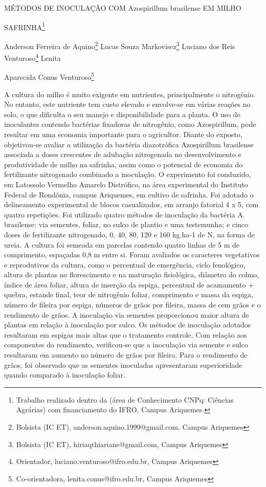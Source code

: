 \documentclass[article,12pt,onesidea,4paper,english,brazil]{abntex2}
\begin{document}
	
	
	\frenchspacing 
	
	\begin{center}
		\LARGE MÉTODOS DE INOCULAÇÃO COM Azospirillum brasilense EM MILHO
		
		SAFRINHA\footnote{Trabalho realizado dentro da (área de Conhecimento CNPq: Ciências Agrárias) com financiamento
			do IFRO, Campus Ariquemes.}
		
		\normalsize
		Anderson Ferreira de Aquino\footnote{Bolsista (IC ET), anderson.aquino.1999@gmail.com, Campus Ariquemes} 
		Lucas Souza Markoviscz\footnote{Bolsista (IC ET), hiriaqthiariane@gmail.com, Campus Ariquemes} 
		Luciano dos Reis Venturoso\footnote{Orientador, luciano.venturoso@ifro.edu.br, Campus Ariquemes} 
		Lenita
		
		Aparecida Conus Venturoso\footnote{Co-orientadora, lenita.conus@ifro.edu.br, Campus Ariquemes} 
	\end{center}
	
	\noindent A cultura do milho é muito exigente em nutrientes, principalmente o nitrogênio. No
	entanto, este nutriente tem custo elevado e envolve-se em várias reações no solo, o
	que dificulta o seu manejo e disponibilidade para a planta. O uso de inoculantes
	contendo bactérias fixadoras de nitrogênio, como Azospirillum, pode resultar em
	uma economia importante para o agricultor. Diante do exposto, objetivou-se avaliar a
	utilização da bactéria diazotrófica Azospirillum brasilense associada a doses
	crescentes de adubação nitrogenada no desenvolvimento e produtividade de milho
	na safrinha, assim como o potencial de economia do fertilizante nitrogenado
	combinado a inoculação. O experimento foi conduzido, em Latossolo Vermelho
	Amarelo Distrófico, na área experimental do Instituto Federal de Rondônia, campus
	Ariquemes, em cultivo de safrinha. Foi adotado o delineamento experimental de
	blocos casualizados, em arranjo fatorial 4 x 5, com quatro repetições. Foi utilizado
	quatro métodos de inoculação da bactéria A. brasilense: via sementes, foliar, no
	sulco de plantio e uma testemunha; e cinco doses de fertilizante nitrogenado, 0, 40,
	80, 120 e 160 kg.ha-1 de N, na forma de ureia. A cultura foi semeada em parcelas
	contendo quatro linhas de 5 m de comprimento, espaçadas 0,8 m entre si. Foram
	avaliados os caracteres vegetativos e reprodutivos da cultura, como o percentual de
	emergência, ciclo fenológico, altura de plantas no florescimento e na maturação
	fisiológica, diâmetro do colmo, índice de área foliar, altura de inserção da espiga,
	percentual de acamamento + quebra, estande final, teor de nitrogênio foliar,
	comprimento e massa da espiga, número de fileira por espiga, números de grãos por
	fileira, massa de cem grãos e o rendimento de grãos. A inoculação via sementes
	proporcionou maior altura de plantas em relação à inoculação por sulco. Os métodos
	de inoculação adotados resultaram em espigas mais altas que o tratamento controle.
	Com relação aos componentes do rendimento, verificou-se que a inoculação via
	semente e sulco resultaram em aumento no número de grãos por fileira. Para o
	rendimento de grãos, foi observado que as sementes inoculadas apresentaram
	superioridade quando comparado à inoculação foliar.
	
\end{document}
